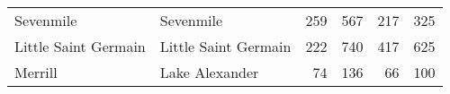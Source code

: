 \begin{table}[h!]
\begin{tabular}{llrrrr}
		Sevenmile                  & Sevenmile                     & 259                                  & 567                                  & 217                        & 325                        \\
		Little Saint Germain       & Little Saint Germain          & 222                                  & 740                                  & 417                        & 625                        \\
		Merrill                    & Lake Alexander                & 74                                   & 136                                  & 66                         & 100                        \\
\hline
	\end{tabular}
	\label{tab:res_table}
\end{table}	
